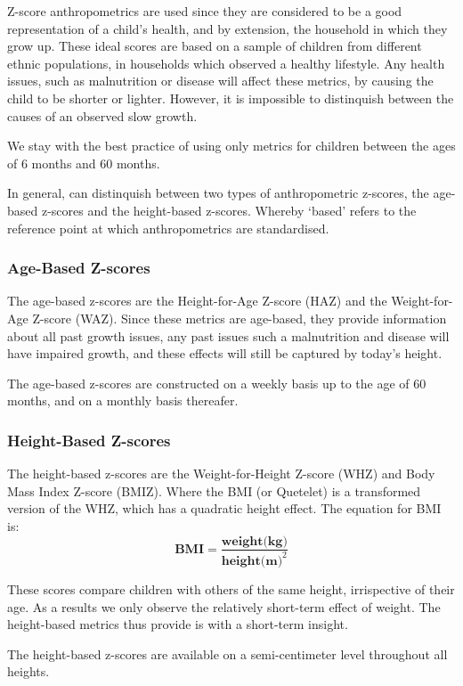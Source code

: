 \begin{refsection}
Z-score anthropometrics are used since they are considered to be a good representation of a child's health,
and by extension, the household in which they grow up.
These ideal scores are based on a sample of children from different ethnic populations,
in households which observed a healthy lifestyle.
Any health issues, such as malnutrition or disease will affect these metrics,
by causing the child to be shorter or lighter.
However, it is impossible to distinquish between the causes of an observed slow growth.

We stay with the best practice of using only metrics for children between the ages of 6 months and 60 months.

In general, can distinquish between two types of anthropometric z-scores, the age-based z-scores and the height-based z-scores.
Whereby `based' refers to the reference point at which anthropometrics are standardised.

\subsubsection{Age-Based Z-scores}
The age-based z-scores are the Height-for-Age Z-score (HAZ) and the Weight-for-Age Z-score (WAZ).
Since these metrics are age-based, they provide information about all past growth issues,
any past issues such a malnutrition and disease will have impaired growth,
and these effects will still be captured by today's height.

The age-based z-scores are constructed on a weekly basis up to the age of 60 months, and on a monthly basis thereafer.


\subsubsection{Height-Based Z-scores}
The height-based z-scores are the Weight-for-Height Z-score (WHZ)
and Body Mass Index Z-score (BMIZ).
Where the BMI (or Quetelet) is a transformed version of the WHZ, which has a quadratic height effect.
The equation for BMI is:
\[
\textbf{BMI} = \frac{\textbf{weight(kg)}}{\textbf{height(m)}^2}
\]

These scores compare children with others of the same height, irrispective of their age.
As a results we only observe the relatively short-term effect of weight.
The height-based metrics thus provide is with a short-term insight.

The height-based z-scores are available on a semi-centimeter level throughout all heights.


\end{refsection}
